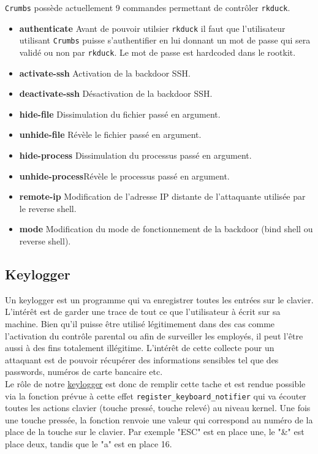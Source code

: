 \documentclass[12pt]{article}
\begin{document}
        \texttt{Crumbs} possède actuellement 9 commandes permettant de contrôler \texttt{rkduck}.
        \begin{itemize}
            \item \textbf{authenticate} Avant de pouvoir utilsier \texttt{rkduck} il faut que l'utilisateur utilisant \texttt{Crumbs} puisse s'authentifier en lui donnant un mot de passe qui sera validé ou non par \texttt{rkduck}. Le mot de passe est hardcoded dans le rootkit.
            \item \textbf{activate-ssh} Activation de la backdoor SSH. 
            \item \textbf{deactivate-ssh} Désactivation de la backdoor SSH.
            \item \textbf{hide-file} Dissimulation du fichier passé en argument.
            \item \textbf{unhide-file} Révèle le fichier passé en argument.
            \item \textbf{hide-process} Dissimulation du processus passé en argument.
            \item \textbf{unhide-process}Révèle le processus passé en argument.
            \item \textbf{remote-ip} Modification de l'adresse IP distante de l'attaquante utilisée par le reverse shell.
            \item \textbf{mode} Modification du mode de fonctionnement de la backdoor (bind shell ou reverse shell).
        \end{itemize}

    \subsection{Keylogger}
        
        Un keylogger est un programme qui va enregistrer toutes les entrées sur le clavier. L'intérêt est de garder une trace de tout ce que l'utilisateur à écrit sur sa machine. Bien qu'il puisse être utilisé légitimement dans des cas comme l'activation du contrôle parental ou afin de surveiller les employés, il peut l'être aussi à des fins totalement illégitime. L'intérêt  de cette collecte pour un attaquant est de pouvoir récupérer des informations sensibles tel que des passwords, numéros de carte bancaire etc. \\
        
        Le rôle de notre \href{https://github.com/QuokkaLight/rkduck/blob/master/rkduck/keylogger.c}{keylogger} est donc de remplir cette tache et est rendue possible via la fonction prévue à cette effet \texttt{register\_keyboard\_notifier} qui va écouter toutes les actions clavier (touche pressé, touche relevé) au niveau kernel. Une fois une touche pressée, la fonction renvoie une valeur qui correspond au numéro de la place de la touche sur le clavier. Par exemple "ESC" est en place une, le "\&" est place deux, tandis que le "a" est en place 16.
        
\end{document}
